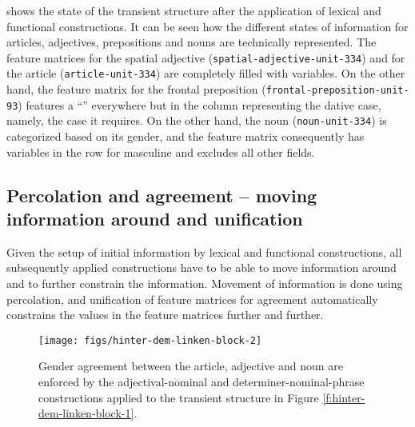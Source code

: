  shows the state of the
transient structure after the application of lexical and functional
constructions. It can be seen how the different states of information
for articles, adjectives, prepositions and nouns are technically
represented. The feature matrices for the spatial adjective
({\footnotesize\texttt{spatial-adjective-unit-334}}) and for the article
({\footnotesize\texttt{article-unit-334}}) are completely filled with variables. On
the other hand, the feature matrix for the frontal preposition
({\footnotesize\texttt{frontal-preposition-unit-93}}) features a ``{\textminus}'' everywhere but
in the column representing the dative case, namely, the case it
requires. On the other hand, the noun ({\footnotesize\texttt{noun-unit-334}}) is
categorized based on its gender, and the feature matrix consequently
has variables in the row for masculine and excludes all other fields.

\subsection{Percolation and agreement -- moving information around and unification}
Given the setup of initial information by lexical and functional
constructions, all subsequently applied constructions have to be able
to move information around and to further constrain the
information. Movement of information is done using percolation, and
unification of feature matrices for agreement automatically constrains
the values in the feature matrices further and further.

\begin{figure}[t]
  \centerline{\texttt{[image: figs/hinter-dem-linken-block-2]}}
  \caption[Gender agreement represented in the transient structure]{%
  Gender agreement 
  between the article, adjective and noun
  are enforced by the adjectival-nominal and
  determiner-nominal-phrase constructions applied to the transient
  structure in Figure \ref{f:hinter-dem-linken-block-1}. }
  \label{f:hinter-dem-linken-block-2}
\end{figure}

